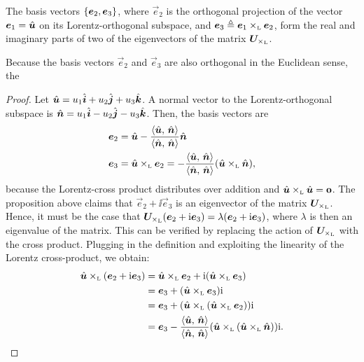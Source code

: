 The basis vectors $ \qty{\vec{e}_2, \vec{e}_3}$, where $\vec{e}_2$ is the orthogonal projection of the vector $\vec{e}_1 = \uvec{u}$ on its Lorentz-orthogonal subspace, and $\vec{e}_3 \triangleq \lorcrossp{\vec{e}_1}{\vec{e}_2}$, form the real and imaginary parts of two of the eigenvectors of the matrix $\mat{U}_{\lorcrossp{}{}}$. 

Because the basis vectors $\vec{e}_2$ and $\vec{e}_3$ are also orthogonal in the Euclidean sense, the 

\begin{proof}
    Let $\uvec{u} = u_1\uvec{i} + u_2\uvec{j} + u_3\uvec{k}$. A normal vector to the Lorentz-orthogonal subspace is $
    \uvec{n} = u_1\uvec{i} - u_2\uvec{j} - u_3\uvec{k}$. Then, the basis vectors are
    \begin{equation}
        \begin{split}
            \vec{e}_2 &= 
            \uvec{u} - \frac{ \inner{\uvec{u}}{\uvec{n}} }{ \inner{\uvec{n}}{\uvec{n}} } \uvec{n} \\
            \vec{e}_3 &= \lorcrossp{\uvec{u}}{\vec{e}_2} = -\frac{ \inner{\uvec{u}}{\uvec{n}} }{ \inner{\uvec{n}}{\uvec{n}} } \qty(\lorcrossp{\uvec{u}}{\uvec{n}}),
        \end{split}
    \end{equation}
    because the Lorentz-cross product distributes over addition and $\lorcrossp{\uvec{u}}{\uvec{u}} = \vec{0}$. The proposition above claims that $\vec{e}_2 + \ii\vec{e}_3$ is an eigenvector of the matrix $\mat{U}_{\lorcrossp{}{}}$. Hence, it must be the case that $\mat{U}_{\lorcrossp{}{}}(\vec{e}_2 + \ii\vec{e}_3) = \lambda(\vec{e}_2 + \ii\vec{e}_3)$, where $\lambda$ is then an eigenvalue of the matrix. This can be verified by replacing the action of $\mat{U}_{\lorcrossp{}{}}$ with the cross product. Plugging in the definition and exploiting the linearity of the Lorentz cross-product, we obtain:
    \begin{equation*}
        \begin{split}
            \lorcrossp{\uvec{u}}{\qty(\vec{e}_2 + \ii\vec{e}_3)} 
            &= \lorcrossp{\uvec{u}}{\vec{e}_2} +
        \ii\qty(\lorcrossp{\uvec{u}}{\vec{e}_3}) \\
            &= \vec{e}_3 + \qty(\lorcrossp{\uvec{u}}{\vec{e}_3})\ii \\ 
            &=\vec{e}_3 +  \qty(\lorcrossp{\uvec{u}}{\qty(\lorcrossp{\uvec{u}}{\vec{e}_2})})\ii \\
            &=\vec{e}_3 -  \frac{ \inner{\uvec{u}}{\uvec{n}} }{ \inner{\uvec{n}}{\uvec{n}} }\qty(\lorcrossp{\uvec{u}}{\qty(\lorcrossp{\uvec{u}}{\uvec{n}})})\ii.  \\

\end{split}
\end{equation*}
\end{proof}
